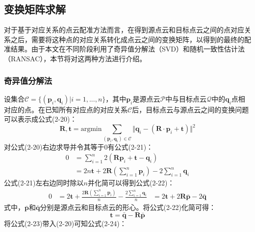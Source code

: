     \subsection{变换矩阵求解}
    对于基于对应关系的点云配准方法而言，在得到源点云和目标点云之间的点对应关系之后，需要将这种点的对应关系转化成点云之间的变换矩阵，以得到的最终的配准结果。由于本文在不同阶段利用了奇异值分解法（SVD）和随机一致性估计法（RANSAC），本节将对这两种方法进行介绍。\par

    \subsubsection{奇异值分解法}
    设集合$\mathcal{C}=\{(\mathbf{p}_i,\mathbf{q}_i)|i=1,...,n\}$，其中$\mathbf{p}_i$是源点云$\mathcal{P}$中与目标点云$\mathcal{Q}$中的$\mathbf{q}_i$点相对应的点。在已知所有对应点的对应关系$\mathcal{C}$后，目标点云与源点云之间的变换问题可以表示成公式(2-20)：
    \begin{equation}
        \mathbf{R},\mathbf{t} = \mathrm{argmin} \sum_{(\mathbf{p}_i,\mathbf{q}_i)\in \mathcal{C}}  \Vert \mathbf{q}_i-(\mathbf{R}\cdot \mathbf{p}_i + \mathbf{t}) \Vert^2
    \end{equation}
    对公式(2-20)右边求导并令其等于0有公式(2-21)：
    \begin{equation}
        \begin{aligned}
        0 
        &= \sum_{i=1}^{n} 2(\mathbf{R} \mathbf{p}_i + \mathbf{t} - \mathbf{q}_i) \\
        &= 2n\mathbf{t} + 2\mathbf{R} (\sum_{i=1}^n \mathbf{p}_i) - 2\sum_{i=1}^n \mathbf{q}_i
        \end{aligned}   
    \end{equation}
    公式(2-21)左右边同时除以$n$并化简可以得到公式(2-22)：
    \begin{equation}
        \begin{aligned}
        0 
        &= 2\mathbf{t} + \frac{2\mathbf{R}(\sum_{i=1}^n \mathbf{p}_i)}{n} -\frac{2\sum_{i=1}^n \mathbf{q}_i}{n}
        &= 2\mathbf{t} + 2\mathbf{R}\mathbf{\bar{p}} -2\mathbf{\bar{q}}
        \end{aligned}   
    \end{equation}
    式中，$\mathbf{\bar{p}}$和$\mathbf{\bar{q}}$分别是源点云和目标点云的形心。将公式(2-22)化简可得：
    \begin{equation}
        \mathbf{t} = \mathbf{\bar{q}} - \mathbf{R}\mathbf{\bar{p}}
    \end{equation}
    将公式(2-23)带入(2-20)可知公式(2-24)：
